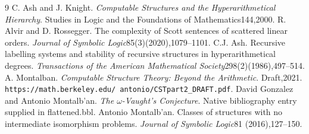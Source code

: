 \begin{thebibliography}{9}
 C. Ash and J. Knight. \emph{Computable Structures and the Hyperarithmetical Hierarchy}. Studies in Logic and the Foundations of Mathematics144,2000.
 R. Alvir and D. Rossegger. The complexity of Scott sentences of scattered linear orders. \emph{Journal of Symbolic Logic}85(3)(2020),1079--1101.
 C.J. Ash. Recursive labelling systems and stability of recursive structures in hyperarithmetical degrees. \emph{Transactions of the American Mathematical Society}298(2)(1986),497--514.
 A. Montalban. \emph{Computable Structure Theory: Beyond the Arithmetic}. Draft,2021. \texttt{https://math.berkeley.edu/\string~antonio/CSTpart2\_DRAFT.pdf}.
 David Gonzalez and Antonio Montalb'an. \emph{The $\omega$-Vaught's Conjecture}. Native bibliography entry supplied in flattened.bbl.
 Antonio Montalb'an. Classes of structures with no intermediate isomorphism problems. \emph{Journal of Symbolic Logic}81 (2016),127--150.
\end{thebibliography}
